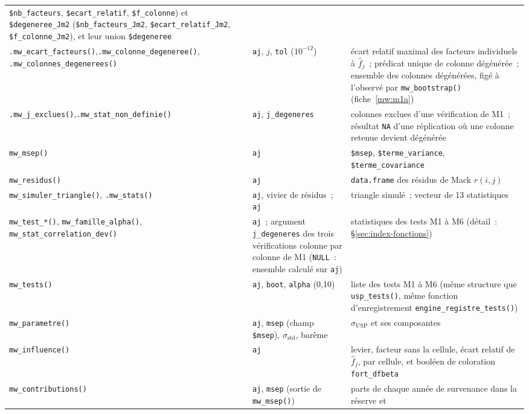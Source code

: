 \documentclass[a4paper,11pt]{article}
\newcommand{\code}[1]{\texttt{\small #1}}
\begin{document}
{\begin{longtable}{@{}p{4.6cm}p{4.0cm}p{6.2cm}@{}}
\code{\$nb\_facteurs}, \code{\$ecart\_relatif}, \code{\$f\_colonne}) et
\code{\$degeneree\_Jm2} (\code{\$nb\_facteurs\_Jm2},
\code{\$ecart\_relatif\_Jm2}, \code{\$f\_colonne\_Jm2}), et leur union
\code{\$degeneree} \\
\code{.mw\_ecart\_facteurs()},\newline \code{.mw\_colonne\_degeneree()},\newline
\code{.mw\_colonnes\_degenerees()} & \code{aj}, $j$, \code{tol} ($10^{-12}$) & écart relatif
maximal des facteurs individuels à $\hat f_j$~; prédicat unique de colonne dégénérée~; ensemble
des colonnes dégénérées, figé à l'observé par \code{mw\_bootstrap()} (fiche~\ref{mw:m1a}) \\
\code{.mw\_j\_exclues()},\newline \code{.mw\_stat\_non\_definie()} & \code{aj},
\code{j\_degeneres} & colonnes exclues d'une vérification de M1~; résultat \code{NA} d'une
réplication où une colonne retenue devient dégénérée \\
\code{mw\_msep()} & \code{aj} & \code{\$msep}, \code{\$terme\_variance},
\code{\$terme\_covariance} \\
\code{mw\_residus()} & \code{aj} & \code{data.frame} des résidus de Mack
$r(i,j)$ \\
\code{mw\_simuler\_triangle()}, \code{.mw\_stats()} & \code{aj}, vivier de
résidus~; \code{aj} & triangle simulé~; vecteur de 13 statistiques \\
\code{mw\_test\_*()}, \code{mw\_famille\_alpha()},
\code{mw\_stat\_correlation\_dev()} & \code{aj}~; argument \code{j\_degeneres} des trois
vérifications colonne par colonne de M1 (\code{NULL}~: ensemble calculé sur \code{aj}) & statistiques des tests M1 à M6 (détail~: §\ref{sec:index-fonctions}) \\
\code{mw\_tests()} & \code{aj}, \code{boot}, \code{alpha} (0,10) &
liste des tests M1 à M6 (même structure que \code{usp\_tests()}, même fonction
d'enregistrement \code{engine\_registre\_tests()}) \\
\code{mw\_parametre()} & \code{aj}, \code{msep} (champ \code{\$msep}),
$\sigma_{\text{std}}$, barème & $\sigma_{\mathrm{USP}}$ et ses composantes \\
\code{mw\_influence()} & \code{aj} & levier, facteur sans la cellule,
écart relatif de $\hat f_j$, par cellule, et booléen de coloration \code{fort\_dfbeta} \\
\code{mw\_contributions()} & \code{aj}, \code{msep} (sortie de
\code{mw\_msep()}) & parts de chaque année de survenance dans la réserve et

\end{longtable}}
\end{document}
